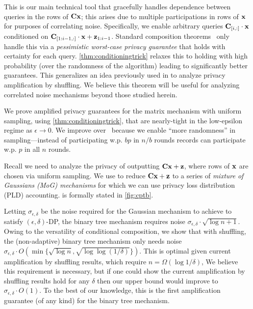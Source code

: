 %
 This is our main technical tool that gracefully handles dependence between queries in the rows of $\mathbf{C}\mathbf{x}$; this arises due to multiple participations in rows of $\mathbf{x}$ for purposes of correlating noise. Specifically, we enable arbitrary queries $\mathbf{C}_{[i,:]}\cdot \mathbf{x}$ conditioned on $\mathbf{C}_{[1:i-1,:]}\cdot \mathbf{x} + \mathbf{z}_{1:i-1}$.
Standard composition theorems~\citep{dwork2014algorithmic} only handle this via a \textit{pessimistic worst-case privacy guarantee} that holds with certainty for each query.
%
\cref{thm:conditioningtrick} relaxes this to holding with high probability (over the randomness of the algorithm)
leading to significantly better guarantees. This generalizes an idea previously used in \citep{LocalToCentral,balle2020privacy} to analyze privacy amplification by shuffling. 
We believe this theorem will be useful
for analyzing correlated noise mechanisms beyond those studied herein. 

 We prove amplified privacy guarantees for the matrix mechanism with uniform sampling, using \cref{thm:conditioningtrick}, that are nearly-tight in the low-epsilon regime as $\epsilon\to0$.
We improve over~\citet{BandedMF} because we enable ``more randomness'' in sampling---instead of participating w.p. $bp$ in $n/b$ rounds records can participate w.p. $p$ in all $n$ rounds.

Recall we need to analyze the privacy of outputting $\mathbf{C} \mathbf{x} + \mathbf{z}$, where rows of $\mathbf{x}$ are chosen via uniform sampling. We use  to reduce $\mathbf{C} \mathbf{x} + \mathbf{z}$ to a series of \textit{mixture of Gaussians (MoG) mechanisms} for which we can use privacy loss distribution (PLD) accounting. \MMCC{} is formally stated in \cref{fig:cptb}. 

\vspace{-0.25em}  %
 Letting $\sigma_{\epsilon, \delta}$ be the noise required for the Gaussian mechanism to achieve to satisfy $(\epsilon, \delta)$-DP, the binary tree mechanism requires noise $ \sigma_{\epsilon, \delta} \cdot \sqrt{\log n + 1}$. Owing to the versatility of conditional composition, we show that with shuffling, the (non-adaptive) binary tree mechanism only needs noise $\sigma_{\epsilon, \delta} \cdot O\left(\min\{\sqrt{\log n}, \sqrt{\log \log (1/\delta)}\}\right)$. This is optimal given current amplification by shuffling results, which require $n = \Omega(\log 1/\delta)$, We believe this requirement is necessary, but if one could show the current amplification by shuffling results hold for any $\delta$ then our upper bound would improve to $\sigma_{\epsilon, \delta} \cdot O(1)$. To the best of our knowledge, this is the first amplification guarantee (of any kind) for the binary tree mechanism. 

